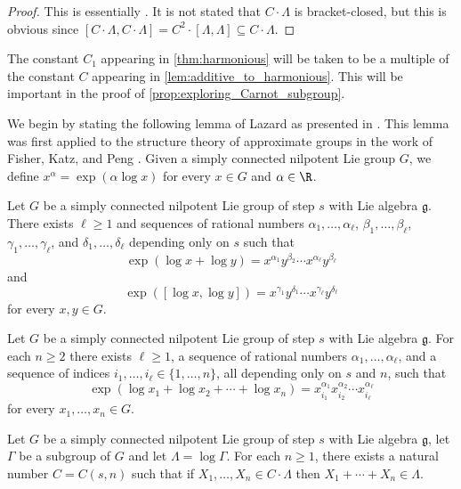 \begin{proof}
This is essentially \cite[Lemma 4.3]{MR3877012}. It is not stated that $C\cdot \Lambda$ is bracket-closed, but this is obvious since $[C \cdot\Lambda,C\cdot\Lambda]= C^2 \cdot [\Lambda,\Lambda] \subseteq C\cdot \Lambda$.
\end{proof}

\begin{remark}\label{rmk:C_divides_C1}
The constant $C_1$ appearing in \cref{thm:harmonious} will be taken to be a multiple of the constant $C$ appearing in \cref{lem:additive_to_harmonious}. This will be important in the proof of \cref{prop:exploring_Carnot_subgroup}.
\end{remark}


We begin by stating the following lemma of Lazard \cite{lazard1954groupes} as presented in \cite[Lemmas 5.2 and 5.3]{breuillard2011approximate}. This lemma was first applied to the structure theory of approximate groups in the work of Fisher, Katz, and Peng \cite{fisher2009freiman}. Given a simply connected nilpotent Lie group $G$, we define $x^\alpha=\exp(\alpha \log x)$ for every $x\in G$ and $\alpha \in \R$.

\begin{lemma}[Lazard]
Let $G$ be a simply connected nilpotent Lie group of step $s$ with Lie algebra $\mathfrak{g}$. There exists $\ell\geq 1$ and sequences of rational numbers $\alpha_1,\ldots,\alpha_\ell$, $\beta_1,\ldots,\beta_\ell$, $\gamma_1,\ldots,\gamma_\ell$, and $\delta_1,\ldots,\delta_\ell$ depending only on $s$ such that
\[
\exp(\log x+\log y)=x^{\alpha_1}y^{\beta_2}\cdots x^{\alpha_\ell} y^{\beta_\ell}
\]
and
\[
\exp([\log x,\log y])=x^{\gamma_1}y^{\delta_1}\cdots x^{\gamma_\ell} y^{\delta_\ell}
\]
for every $x,y \in G$.
\end{lemma}

\begin{corollary}
\label{cor:expansion_of_sums}
Let $G$ be a simply connected nilpotent Lie group of step $s$ with Lie algebra $\mathfrak{g}$. For each $n\geq 2$ there exists $\ell\geq 1$, a sequence of rational numbers $\alpha_1,\ldots,\alpha_\ell$, and a sequence of indices $i_1,\ldots,i_\ell \in \{1,\ldots,n\}$, all depending only on $s$ and $n$, such that
\[
\exp(\log x_1+\log x_2 + \cdots + \log x_n )=x^{\alpha_1}_{i_1} x^{\alpha_2}_{i_2}\cdots x^{\alpha_\ell}_{i_\ell}
\]
for every $x_1,\ldots,x_n \in G$.
\end{corollary}

\begin{corollary}
\label{cor:expansion_of_sums2}
Let $G$ be a simply connected nilpotent Lie group of step $s$ with Lie algebra $\mathfrak{g}$, let $\Gamma$ be a subgroup of $G$ and let $\Lambda = \log \Gamma$. For each $n\geq 1$, there exists a natural number $C=C(s,n)$ such that if $X_1,\ldots,X_n \in C\cdot \Lambda$ then $X_1+\cdots+X_n \in \Lambda$.
\end{corollary}

